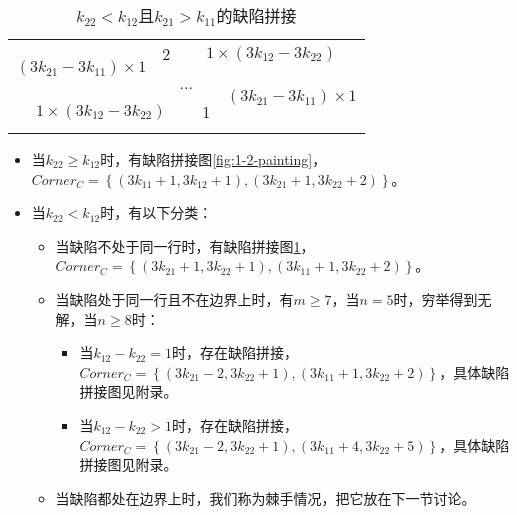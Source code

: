 \begin{table}[t]
	\centering
	\caption{$k_{22} < k_{12}$且$k_{21} > k_{11}$的缺陷拼接}
	\begin{tabular}{|cc|ccc|cc|}
		\hline
		\multicolumn{2}{|c|}{\multirow{3}{*}{$(3k_{21} - 3k_{11}) \times 1$}} & 2 & \multicolumn{4}{|c|}{$1 \times  (3k_{12} - 3k_{22})$}                                                                                 \\
		\cline{3-7}
		                                                                      &   & \multicolumn{3}{c}{\multirow{2}{*}{...}}              & \multicolumn{2}{|c|}{\multirow{3}{*}{$(3k_{21} - 3k_{11}) \times 1$}}         \\
		                                                                      &   &                                                       &                                                                       &  &  & \\
		\cline{1-5}
		\multicolumn{4}{|c|}{$1 \times  (3k_{12} - 3k_{22})$}                 & 1 &                                                       &                                                                               \\
		\hline
		\label{fig:2-1-painting-1}
	\end{tabular}
\end{table}

\begin{itemize}
	\item 当$k_{22} \ge k_{12}$时，有缺陷拼接图\ref*{fig:1-2-painting}，\\
	      $Corner_C = \left\{(3k_{11} + 1, 3k_{12} + 1), (3k_{21} + 1, 3k_{22} + 2)\right\}$。
	\item 当$k_{22} < k_{12}$时，有以下分类：
	      \begin{itemize}
		      \item 当缺陷不处于同一行时，有缺陷拼接图\ref*{fig:2-1-painting-1}，\\
		            $Corner_C = \left\{(3k_{21} + 1, 3k_{22} + 1), (3k_{11} + 1, 3k_{22} + 2)\right\}$。
		      \item 当缺陷处于同一行且不在边界上时，有$m \ge 7$，当$n = 5$时，穷举得到无解，当$n \ge 8$时：
		            \begin{itemize}
			            \item 当$k_{12} - k_{22} = 1$时，存在缺陷拼接，\\
			                  $Corner_C = \left\{(3k_{21} - 2, 3k_{22} + 1), (3k_{11} + 1, 3k_{22} + 2)\right\}$，具体缺陷拼接图见附录。
			            \item 当$k_{12} - k_{22} > 1$时，存在缺陷拼接，\\
			                  $Corner_C = \left\{(3k_{21} - 2, 3k_{22} + 1), (3k_{11} + 4, 3k_{22} + 5)\right\}$，具体缺陷拼接图见附录。
		            \end{itemize}
		      \item 当缺陷都处在边界上时，我们称为棘手情况，把它放在下一节讨论。
	      \end{itemize}
\end{itemize}


